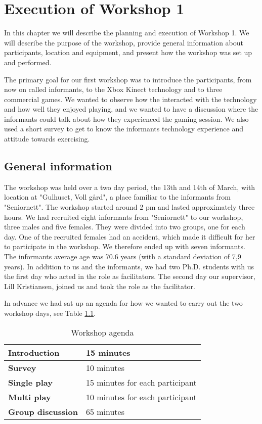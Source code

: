 \chapter{Execution of Workshop 1}
In this chapter we will describe the planning and execution of  Workshop 1. We will describe the purpose of the workshop, provide general information about participants, location and equipment, and present how the workshop was set up and performed. 

The primary goal for our first workshop was to introduce the participants, from now on called informants, to the Xbox Kinect technology and to three commercial games. We wanted to observe how the interacted with the technology and how well they enjoyed playing, and we wanted to have a discussion where the informants could talk about how they experienced the gaming session. We also used a short survey to get to know the informants technology experience and attitude towards exercising.    

\section{General information}
The workshop was held over a two day period, the 13th and 14th of March, with location at "Gulhuset, Voll gård", a place familiar to the informants from "Seniornett". The workshop started around 2 pm and lasted approximately three hours. We had recruited eight informants from "Seniornett" to our workshop, three males and five females. They were divided into two groups, one for each day. One of the recruited females had an accident, which made it difficult for her to participate in the workshop. We therefore ended up with seven informants. The informants average age was 70.6 years (with a standard deviation of 7,9 years). In addition to us and the informants, we had two Ph.D. students with us the first day who acted in the role as facilitators. The second day our supervisor, Lill Kristiansen, joined us and took the role as the facilitator.   

In advance we had sat up an agenda for how we wanted to carry out the two workshop days,  see Table \ref{tab:agendaW1}.  

\begin{table} [ht!]
\centering
    \begin{tabular}{|l|l|}
       \hline
       \textbf{Introduction} & 15 minutes  \\ \hline
       \textbf{Survey} & 10 minutes  \\ \hline
       \textbf{Single play} & 15 minutes for each participant \\ \hline
       \textbf{Multi play} & 10 minutes for each participant \\ \hline
	   \textbf{Group discussion} & 65 minutes \\ \hline
    \end{tabular}
    \caption[Workshop Agenda]{Workshop agenda}
    \label{tab:agendaW1}
\end{table} 

